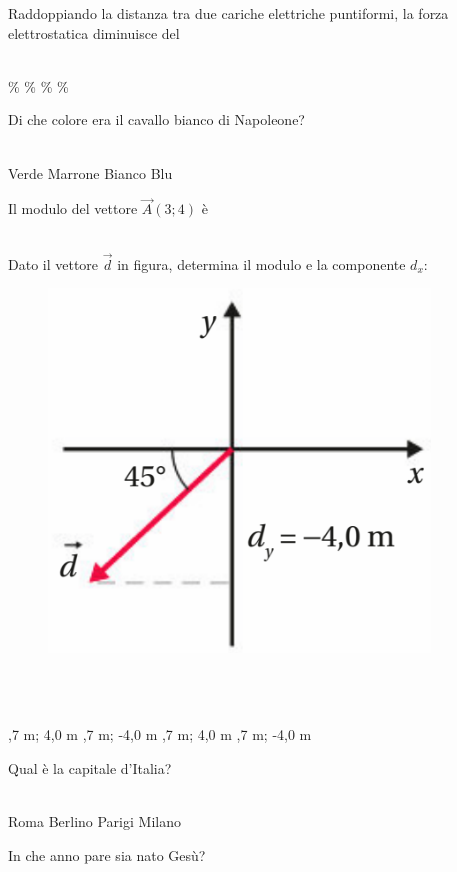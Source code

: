 \documentclass[a4paper,11pt]{exam}
\begin{document}
\begin{questions}
    
\question Raddoppiando la distanza tra due cariche elettriche puntiformi, la forza elettrostatica diminuisce del\\\
\begin{oneparchoices}
  \%
  \%
  \%
  \%
\end{oneparchoices}

    
\question Di che colore era il cavallo bianco di Napoleone?\\\
\begin{oneparchoices}
  \choice Verde
  \choice Marrone
  \choice Bianco
  \choice Blu 
\end{oneparchoices}

    
\question Il modulo del vettore $\vec{A}(3;4)$ è\\\
\begin{oneparchoices}
  \choice 12
  \choice 25
\end{oneparchoices}

    
\question Dato il vettore $\vec{d}$ in figura, determina il modulo e la componente $d_x$: \begin{figure}[h!]   \begin{center}     \includegraphics[scale=0.35]{vettored.png}   \end{center} \end{figure}\\\
\begin{oneparchoices}
  ,7 m; 4,0 m
  \choice 5,7 m; -4,0 m
  \choice 5,7 m; 4,0 m
  \choice -5,7 m; -4,0 m
\end{oneparchoices}

    
\question Qual è la capitale d’Italia?\\\
\begin{oneparchoices}
  \choice Roma
  \choice Berlino
  \choice Parigi
  \choice Milano
\end{oneparchoices}

    
\question In che anno pare sia nato Gesù?\\\
\begin{oneparchoices}
  \choice 20
  \choice -80
\end{oneparchoices}

    
\end{questions}
\end{document}
